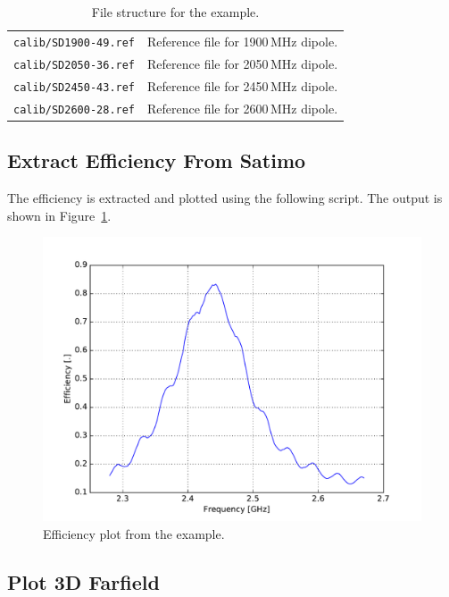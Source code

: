 \documentclass[10pt]{article}
\begin{document}
\begin{table}[htbp]
\begin{tabular}{|l|l|}
        \texttt{calib/SD1900-49.ref}  & Reference file for 1900\,MHz dipole. \\
        \texttt{calib/SD2050-36.ref}  & Reference file for 2050\,MHz dipole. \\
        \texttt{calib/SD2450-43.ref}  & Reference file for 2450\,MHz dipole. \\
        \texttt{calib/SD2600-28.ref}  & Reference file for 2600\,MHz dipole. \\
        \hline
    \end{tabular}
    \caption{File structure for the example.}
    \label{tab:example}
\end{table}

\clearpage
\subsection{Extract Efficiency From Satimo}

The efficiency is extracted and plotted using the following script. The output is shown in Figure~\ref{fig:example1}.

\begin{figure}[htbp]
    \centering
    \includegraphics[scale=0.5]{examples/ex1_efficiency.pdf} 
    \caption{Efficiency plot from the example.}
    \label{fig:example1}
\end{figure}

\clearpage
\subsection{Plot 3D Farfield}
\end{document}
